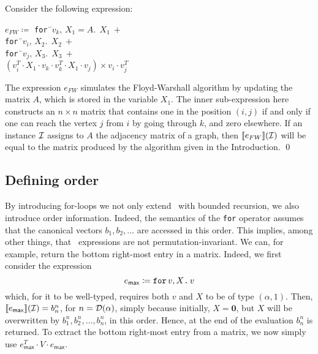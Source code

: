 \begin{example}\label{ex:floyd}
Consider the following expression:
\begin{center}
\parbox{0cm}{
\begin{tabbing}
$e_{FW} \coloneqq  $ \texttt{for\,}\=$v_k,\, X_1\!=\!A.\ \ X_1 \ + $\\
\> \texttt{for\,}\=$v_i, \, X_2.\ \ X_2 \ +$ \\
\>\>\texttt{for\,}\=$v_j,\, X_3.\ \ X_3 \ +$ \\
\>\>\>$(v_i^T\cdot X_1\cdot v_k \cdot v_k^T\cdot X_1\cdot v_j)\times v_i\cdot v_j^T$
\end{tabbing}
}
\end{center}
The expression $e_{FW}$ simulates the Floyd-Warshall algorithm by updating the matrix $A$, which is stored in the variable $X_1$. The inner sub-expression here constructs an $n\times n$ matrix that contains one in the position $(i,j)$ if and only if one can reach the vertex $j$ from $i$ by going through $k$, and zero elsewhere. If an instance $\mathcal{I}$ assigns to $A$ the adjacency matrix of a graph, then $\llbracket e_{FW} \rrbracket(\mathcal{I})$ will be equal to the matrix produced by the algorithm given in the Introduction.
\qed
\end{example}

\subsection{Defining order}
\label{sec:formatlang:design}

By introducing for-loops we not only extend \lang\ with bounded recursion, we also introduce order information. Indeed,
the semantics of the \texttt{for} operator assumes that the canonical vectors $b_1,b_2,\ldots$
are accessed in this order. This implies, among other things, that \langfor\ expressions are not permutation-invariant.
We can, for example, return the bottom right-most entry in a matrix. Indeed, we first consider the expression 
$$
e_{\mathsf{max}} \coloneqq  \texttt{for}\, v,X \texttt{.}\, v
$$
which, for it to be well-typed, requires both $v$ and $X$ to be of type $(\alpha,1)$. Then, $\llbracket e_{\mathsf{max}} \rrbracket(\mathcal{I})=b_n^n$, for $n=\mathcal{D}(\alpha)$, simply because initially, $X=\mathbf{0}$, but $X$ will be overwritten by $b_1^n,b_2^n,\ldots,b_n^n$, in this order. Hence, at the end of the evaluation $b_n^n$ is returned.
To extract the bottom right-most entry from a matrix, we now simply use $e_{\mathsf{max}}^T\cdot V\cdot e_{\mathsf{max}}$.



